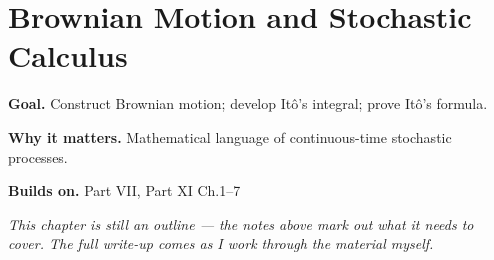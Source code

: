 \chapter{Brownian Motion and Stochastic Calculus}
\label{ch:11-probability-theory-08}

\begin{chapterintro}
\textbf{Goal.} Construct Brownian motion; develop Itô's integral; prove Itô's formula.

\textbf{Why it matters.} Mathematical language of continuous-time stochastic processes.

\textbf{Builds on.} Part VII, Part XI Ch.1–7
\end{chapterintro}

\textit{This chapter is still an outline --- the notes above mark out what it needs to cover. The full write-up comes as I work through the material myself.}
